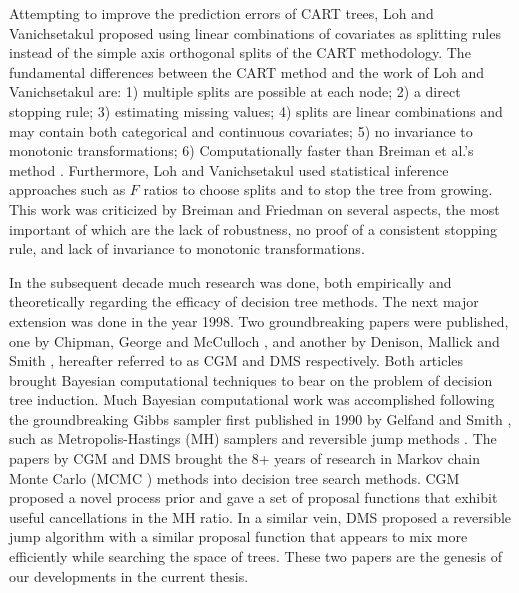 Attempting to improve the prediction errors of CART trees, Loh and Vanichsetakul proposed using linear combinations of covariates as splitting rules instead of the simple axis orthogonal splits of the CART methodology. The fundamental differences between the CART method and the work of Loh and Vanichsetakul are: 1) multiple splits are possible at each node; 2) a direct stopping rule; 3) estimating missing values; 4) splits are linear combinations and may contain both categorical and continuous covariates;  5) no invariance to monotonic transformations; 6) Computationally faster than Breiman et al.'s method \cite{loh1988tree}. Furthermore, Loh and Vanichsetakul used statistical inference approaches such as $F$ ratios to choose splits and to stop the tree from growing. This work was criticized by Breiman and Friedman  \cite{breiman1988comment} on several aspects, the most important of which are the lack of robustness, no proof of a consistent stopping rule, and lack of invariance to monotonic transformations. 

In the subsequent decade much research was done, both empirically and theoretically regarding the efficacy of decision tree methods. The next major extension was done in the year 1998. Two groundbreaking papers were published, one by Chipman, George and McCulloch \cite{chipman1998bayesian}, and another by Denison, Mallick and Smith \cite{denison1998bayesian}, hereafter referred to as CGM and DMS  respectively. Both articles brought Bayesian computational techniques to bear on the problem of decision tree induction. Much Bayesian computational work was accomplished following the groundbreaking Gibbs sampler first published in 1990 by Gelfand and Smith \cite{gelfand1990sampling}, such as Metropolis-Hastings (MH) samplers \cite{hastings1970monte,robert1999monte} and reversible jump methods \cite{green1995reversible}. The papers by CGM and DMS brought the 8+ years of research in Markov chain Monte Carlo (MCMC \hspace{-.1cm}) methods into decision tree search methods. CGM proposed a novel process prior and gave a set of proposal functions that exhibit useful cancellations in the MH ratio. In a similar vein, DMS proposed a reversible jump algorithm with a similar proposal function that appears to mix more efficiently while searching the space of trees. These two papers are the genesis of our developments in the current thesis. 

